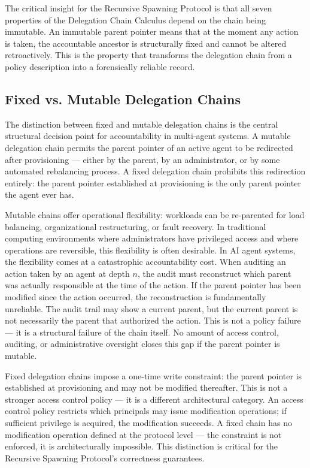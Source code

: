The critical insight for the Recursive Spawning Protocol is that all seven properties of the Delegation Chain Calculus depend on the chain being immutable. An immutable parent pointer means that at the moment any action is taken, the accountable ancestor is structurally fixed and cannot be altered retroactively. This is the property that transforms the delegation chain from a policy description into a forensically reliable record.

\subsection{Fixed vs. Mutable Delegation Chains}
\label{sec:fixed-vs-mutable}

The distinction between fixed and mutable delegation chains is the central structural decision point for accountability in multi-agent systems. A mutable delegation chain permits the parent pointer of an active agent to be redirected after provisioning --- either by the parent, by an administrator, or by some automated rebalancing process. A fixed delegation chain prohibits this redirection entirely: the parent pointer established at provisioning is the only parent pointer the agent ever has.

Mutable chains offer operational flexibility: workloads can be re-parented for load balancing, organizational restructuring, or fault recovery. In traditional computing environments where administrators have privileged access and where operations are reversible, this flexibility is often desirable. In AI agent systems, the flexibility comes at a catastrophic accountability cost. When auditing an action taken by an agent at depth $n$, the audit must reconstruct which parent was actually responsible at the time of the action. If the parent pointer has been modified since the action occurred, the reconstruction is fundamentally unreliable. The audit trail may show a current parent, but the current parent is not necessarily the parent that authorized the action. This is not a policy failure --- it is a structural failure of the chain itself. No amount of access control, auditing, or administrative oversight closes this gap if the parent pointer is mutable.

Fixed delegation chains impose a one-time write constraint: the parent pointer is established at provisioning and may not be modified thereafter. This is not a stronger access control policy --- it is a different architectural category. An access control policy restricts which principals may issue modification operations; if sufficient privilege is acquired, the modification succeeds. A fixed chain has no modification operation defined at the protocol level --- the constraint is not enforced, it is architecturally impossible. This distinction is critical for the Recursive Spawning Protocol's correctness guarantees.

